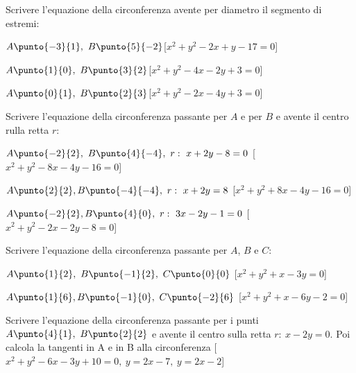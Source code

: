 \begin{esercizio}\label{ese:}
Scrivere l'equazione della circonferenza avente per diametro il segmento di 
estremi:
 \begin{enumeratea}
  \item  \(A\punto{-3}{1},~B\punto{5}{-2}\)\hfill [\(x^2+y^2-2x+y-17=0\)]
  \item  \(A\punto{1}{0},~B\punto{3}{2}\)\hfill [\(x^2+y^2-4x-2y+3=0\)]
  \item  \(A\punto{0}{1},~B\punto{2}{3}\)\hfill [\(x^2+y^2-2x-4y+3=0\)]
 \end{enumeratea}
\end{esercizio}

\begin{esercizio}\label{ese:}
Scrivere l'equazione della circonferenza passante per \(A\) e per \(B\) e 
avente il centro rulla retta \(r\):
 \begin{enumeratea}
  \item  \(A\punto{-2}{2},~B\punto{4}{-4},~r:~x+2y-8=0\)
  \hfill [\(x^2+y^2-8x-4y-16=0\)]
  \item  \(A\punto{2}{2}, B\punto{-4}{-4},~r:~x+2y=8\)
  \hfill [\(x^2+y^2+8x-4y-16=0\)]
  \item  \(A\punto{-2}{2}, B\punto{4}{0},~r:~3x-2y-1=0\)
  \hfill [\(x^2+y^2-2x-2y-8=0\)]
 \end{enumeratea}
\end{esercizio}

\begin{esercizio}\label{ese:}
Scrivere l'equazione della circonferenza passante per \(A\), \(B\) e \(C\):
 \begin{enumeratea}
  \item  \(A\punto{1}{2},~B\punto{-1}{2},~C\punto{0}{0}\)
  \hfill [\(x^2+y^2+x-3y=0\)]
  \item  \(A\punto{1}{6}, B\punto{-1}{0},~C\punto{-2}{6}\)
  \hfill [\(x^2+y^2+x-6y-2=0\)]
 \end{enumeratea}
\end{esercizio}

\begin{esercizio}\label{ese:}        
Scrivere l'equazione della circonferenza passante per i punti 
\(A\punto{4}{1},~B\punto{2}{2}\) e avente il centro sulla retta \(r:~x-2y=0\).
Poi calcola la tangenti in A e in B alla circonferenza 
\hfill [\(x^2+y^2-6x-3y+10=0,~y=2x-7,~y=2x-2\)]
\end{esercizio}


